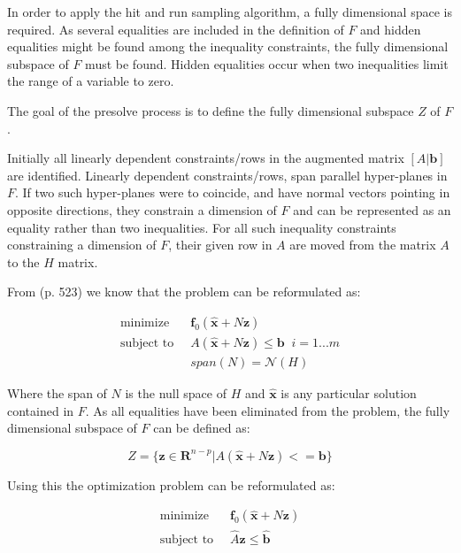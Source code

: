 \documentclass[11pt,a4paper,english]{article}
\begin{document}
In order to apply the hit and run sampling algorithm, a fully dimensional space is required. As several equalities are included in the definition of $F$ and hidden equalities might be found among the inequality constraints, the fully dimensional subspace of $F$ must be found. Hidden equalities occur when two inequalities limit the range of a variable to zero. 

The goal of the presolve process is to define the fully dimensional subspace $Z$ of $F$. 

Initially all linearly dependent constraints/rows in the augmented matrix $[ A|\mathbf{b}] $ are identified. Linearly dependent constraints/rows, span parallel hyper-planes in $F$. If two such hyper-planes were to coincide, and have normal vectors pointing in opposite directions, they constrain a dimension of $F$ and can be represented as an equality rather than two inequalities. For all such inequality constraints constraining a dimension of $F$, their given row in $A$ are moved from the matrix $A$ to the $H$ matrix.

From \cite{ConvexOpimization} (p. 523) we know that the problem can be reformulated as: 

\begin{align}
\text{minimize} \;&\; \mathbf{f}_0(\mathbf{\hat{x}} + N \mathbf{z})  \\
\text{subject to} \; &\; A(\mathbf{\hat{x}} + N \mathbf{z}) \leq \mathbf{b} \; \; i=1...m\\
\;            &\;  span(N) = \mathcal{N}(H)
\end{align}

Where the span of $N$ is the null space of $H$ and $\mathbf{\hat{x}}$ is any particular solution contained in $F$.
As all equalities have been eliminated from the problem, the fully dimensional subspace of $F$ can be defined as:

\begin{equation}
Z = \{\mathbf{z} \in \mathbf{R}^{n-p} | A(\mathbf{\hat{x}} +  N \mathbf{z}) <= \mathbf{b}  \}
\end{equation}

Using this the optimization problem can be reformulated as:

\begin{align}
	\text{minimize} \;&\; \mathbf{f}_0(\mathbf{\hat{x}} + N \mathbf{z})  \\
	\text{subject to} \; &\; \hat{A}\mathbf{z} \leq \mathbf{\hat{b}} \label{eq:sub_problem}
\end{align}
\end{document}
